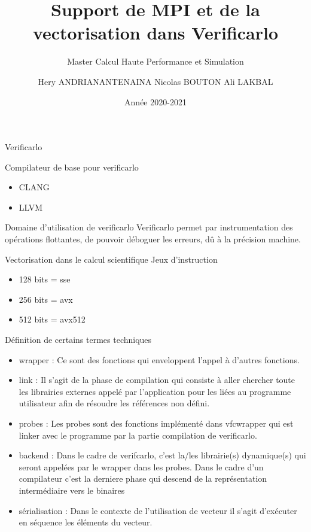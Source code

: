 \documentclass{beamer}
\title[Support pour Verificarlo]{Support de MPI et de la vectorisation dans Verificarlo}
\subtitle{Master Calcul Haute Performance et Simulation}
\author[Hery, Nicolas, Ali]{Hery ANDRIANANTENAINA \newline Nicolas BOUTON \newline Ali LAKBAL}
\institute[]{\textbf{Encadrant:} Eric PETIT}
\date{Année 2020-2021}
\begin{document}
\maketitle

\begin{frame}{Verificarlo}
    \begin{block}{Compilateur de base pour verificarlo}
      \begin{itemize}
          \item CLANG
          \item LLVM
      \end{itemize}
    \end{block}
  \begin{block}{Domaine d'utilisation de verificarlo}
    Verificarlo permet par instrumentation des opérations flottantes, de pouvoir déboguer les erreurs, dû à la précision machine.
  \end{block}
  \begin{block}{Vectorisation dans le calcul scientifique}
    Jeux d'instruction 
        \begin{itemize}
            \item 128 bits = sse
            \item 256 bits = avx
            \item 512 bits = avx512
        \end{itemize}
  \end{block}
\end{frame}

\begin{frame}{Définition de certains termes techniques}
      \begin{itemize}
          \item wrapper : Ce sont des fonctions qui enveloppent l’appel à d’autres fonctions.
          \item link : Il s’agit de la phase de compilation qui consiste à aller chercher toute les librairies externes appelé par l’application pour les liées au programme utilisateur afin de résoudre les références non défini.
          \item probes : Les probes sont des fonctions implémenté dans vfcwrapper qui est linker avec le programme par la partie compilation de verificarlo.
          \item backend : Dans le cadre de verifcarlo, c’est la/les librairie(s) dynamique(s) qui seront appelées par le wrapper dans les probes. Dans le cadre d’un compilateur c’est la derniere phase qui descend de la représentation intermédiaire vers le binaires
          \item sérialisation : Dans le contexte de l’utilisation de vecteur il s’agit d’exécuter en séquence les éléments du vecteur.
      \end{itemize}
\end{frame}
\end{document}
